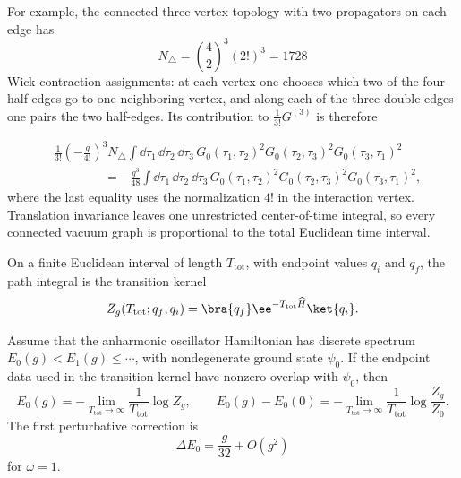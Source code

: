 For example, the connected three-vertex topology with two propagators on each
edge has
\[
  N_\triangle=\binom{4}{2}^3(2!)^3=1728
\]
Wick-contraction assignments: at each vertex one chooses which two of the four
half-edges go to one neighboring vertex, and along each of the three double
edges one pairs the two half-edges.  Its contribution to
\(\frac{1}{3!}G^{(3)}\) is therefore
\begin{center}
\end{center}
\[
\begin{aligned}
  &\frac{1}{3!}
  \left(-\frac{g}{4!}\right)^3
  N_\triangle
  \int\dd\tau_1\,\dd\tau_2\,\dd\tau_3\,
  G_0(\tau_1,\tau_2)^2
  G_0(\tau_2,\tau_3)^2
  G_0(\tau_3,\tau_1)^2                                      \\
  &\hspace{4em}
  =
  -\frac{g^3}{48}\int\dd\tau_1\,\dd\tau_2\,\dd\tau_3\,
  G_0(\tau_1,\tau_2)^2
  G_0(\tau_2,\tau_3)^2
  G_0(\tau_3,\tau_1)^2,
\end{aligned}
\]
where the last equality uses the normalization \(4!\) in the interaction
vertex.  Translation invariance leaves one unrestricted
center-of-time integral, so every connected vacuum graph is proportional to
the total Euclidean time interval.

On a finite Euclidean interval of length \(T_{\mathrm{tot}}\), with endpoint
values \(q_i\) and \(q_f\), the path integral is the transition kernel
\[
  Z_g(T_{\mathrm{tot}};q_f,q_i)
  =
  \bra{q_f}\ee^{-T_{\mathrm{tot}}\widehat H}\ket{q_i}.
\]
\begin{proposition}
\label{prop:ground-state-energy-from-euclidean-kernel}
Assume that the anharmonic oscillator Hamiltonian has discrete spectrum
\(E_0(g)<E_1(g)\le\cdots\), with nondegenerate ground state \(\psi_0\).  If
the endpoint data used in the transition kernel have nonzero overlap with
\(\psi_0\), then
\[
  E_0(g)
  =
  -\lim_{T_{\mathrm{tot}}\to\infty}
  \frac{1}{T_{\mathrm{tot}}}\log Z_g,
  \qquad
  E_0(g)-E_0(0)
  =
  -\lim_{T_{\mathrm{tot}}\to\infty}
  \frac{1}{T_{\mathrm{tot}}}
  \log\frac{Z_g}{Z_0}.
\]
The first perturbative correction is
\[
  \Delta E_0=\frac{g}{32}+O(g^2)
\]
for \(\omega=1\).
\end{proposition}

